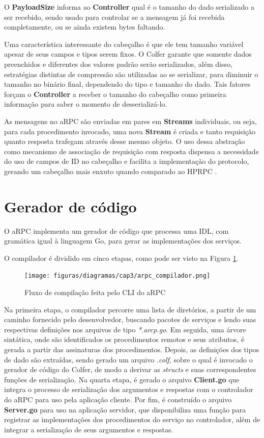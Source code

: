 O \textbf{PayloadSize} informa ao \textbf{Controller} qual é o tamanho do dado serializado a ser recebido, sendo usado para controlar se a mensagem já foi recebida completamente, ou se ainda existem bytes faltando.

Uma característica interessante do cabeçalho é que ele tem tamanho variável apesar de seus campos e tipos serem fixos. O Colfer garante que somente dados preenchidos e diferentes dos valores padrão serão serializados, além disso, estratégias distintas de compressão são utilizadas ao se serializar, para diminuir o tamanho no binário final, dependendo do tipo e tamanho do dado. Tais fatores forçam o \textbf{Controller} a receber o tamanho do cabeçalho como primeira informação para saber o momento de desserializá-lo.

As mensagens no aRPC são enviadas em pares em \textbf{Streams} individuais, ou seja, para cada procedimento invocado, uma nova \textbf{Stream} é criada e tanto requisição quanto resposta trafegam através desse mesmo objeto. O uso dessa abstração como mecanismo de associação de requisição com resposta dispensa a necessidade do uso de campos de ID no cabeçalho e facilita a implementação do protocolo, gerando um cabeçalho mais enxuto quando comparado ao HPRPC \cite{bagci_lightweight_2016}.

\section{Gerador de código}

O aRPC implementa um gerador de código que processa uma IDL, com gramática igual à linguagem Go, para gerar as implementações dos serviços.

O compilador é dividido em cinco etapas, como pode ser visto na Figura \ref{fig:arpc_compiler_pipeline}. 

\begin{figure}[ht]
    \centering
    \caption{Fluxo de compilação feita pelo CLI do aRPC}
    \texttt{[image: figuras/diagramas/cap3/arpc\_compilador.png]} 
    \label{fig:arpc_compiler_pipeline}
\end{figure}

Na primeira etapa, o compilador percorre uma lista de diretórios, a partir de um caminho fornecido pelo desenvolvedor, buscando pacotes de serviços e lendo suas respectivas definições nos arquivos de tipo \textit{*.arcp.go}. Em seguida, uma árvore sintática, onde são identificados os procedimentos remotos e seus atributos, é gerada a partir das assinaturas dos procedimentos. Depois, as definições dos tipos de dado são extraídas, sendo gerado um arquivo \textit{.colf}, sobre o qual é invocado o gerador de código do Colfer, de modo a derivar as \textit{structs} e suas correspondentes funções de serialização. Na quarta etapa, é gerado o arquivo \textbf{Client.go} que integra o processo de serialização dos argumentos e respostas com o controlador do aRPC para uso pela aplicação cliente. Por fim, é construído o arquivo \textbf{Server.go} para uso na aplicação servidor, que disponibiliza uma função para registrar as implementações dos procedimentos do serviço no controlador, além de integrar a serialização de seus argumentos e respostas.

